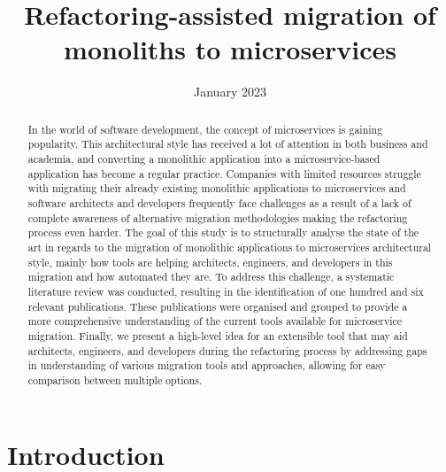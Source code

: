 \documentclass[conference]{IEEEtran}
\title{Refactoring-assisted migration of monoliths to microservices}
\author{
  \IEEEauthorblockN{Breno Salles}
  \IEEEauthorblockA{
    \textit{Faculty of Engineering} \\
    \textit{University of Porto}\\
    Porto, Portugal \\
    up202103389@fe.up.pt
  }
}
\date{January 2023}
\begin{document}
\maketitle

\begin{abstract}


 In the world of software development, the concept of microservices is gaining
 popularity. This architectural style has received a lot of attention in both
 business and academia, and converting a monolithic application into a
 microservice-based application has become a regular practice. Companies with
 limited resources struggle with migrating their already existing monolithic
 applications to microservices and software architects and developers
 frequently face challenges as a result of a lack of complete awareness of
 alternative migration methodologies making the refactoring process even
 harder. The goal of this study is to structurally analyse the state of the
 art in regards to the migration of monolithic applications to microservices
 architectural style, mainly how tools are helping architects, engineers, and
 developers in this migration and how automated they are. To address this
 challenge, a systematic literature review was conducted, resulting in the
 identification of one hundred and six relevant publications. These
 publications were organised and grouped to provide a more comprehensive
 understanding of the current tools available for microservice migration.
 Finally, we present a high-level idea for an extensible tool that may aid
 architects, engineers, and developers during the refactoring process by
 addressing gaps in understanding of various migration tools and approaches,
 allowing for easy comparison between multiple options.

\end{abstract}

\section{Introduction} \label{sec:introduction}
\end{document}
